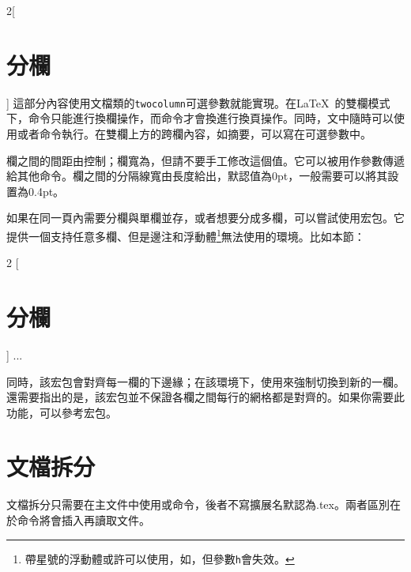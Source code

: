 \begin{multicols}{2}[\section{分欄}]
這部分內容使用文檔類的\texttt{two\-column}可選參數就能實現。在\LaTeX\ 的雙欄模式下，命令只能進行換欄操作，而命令才會換進行換頁操作。同時，文中隨時可以使用或者命令執行。在雙欄上方的跨欄內容，如摘要，可以寫在可選參數中。

欄之間的間距由控制；欄寬為，但請不要手工修改這個值。它可以被用作參數傳遞給其他命令。欄之間的分隔線寬由長度給出，默認值為0pt，一般需要可以將其設置為0.4pt。 

如果在同一頁內需要分欄與單欄並存，或者想要分成多欄，可以嘗試使用宏包。它提供一個支持任意多欄、但是邊注和浮動體\footnote{帶星號的浮動體或許可以使用，如，但參數\texttt{h}會失效。}無法使用的環境。比如本節：
\begin{latex}
\begin{multicols}{2}
  [\section{分欄}]
  ...
\end{multicols}
\end{latex}

同時，該宏包會對齊每一欄的下邊緣；在該環境下，使用來強制切換到新的一欄。還需要指出的是，該宏包並不保證各欄之間每行的網格都是對齊的。如果你需要此功能，可以參考宏包。
\end{multicols}

\section{文檔拆分}
\label{sec:include}
文檔拆分只需要在主文件中使用或命令，後者不寫擴展名默認為.tex。兩者區別在於命令將會插入再讀取文件。

